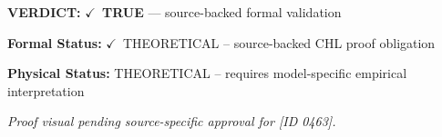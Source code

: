 \textbf{VERDICT:} \ensuremath{\checkmark}\ \textbf{TRUE} --- source-backed formal validation

\textbf{Formal Status:} \ensuremath{\checkmark}\ THEORETICAL -- source-backed CHL proof obligation

\textbf{Physical Status:} THEORETICAL -- requires model-specific empirical interpretation
\par\vspace{0.45em}
\par
\vfill
\begingroup\footnotesize\itshape
Proof visual pending source-specific approval for [ID 0463].
\par\endgroup
\vfill
\endgroup
\endgroup
